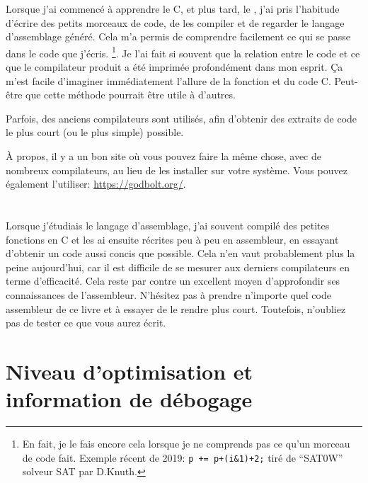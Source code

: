 ﻿

Lorsque j'ai commencé à apprendre le C, et plus tard, le \Cpp, j'ai pris l'habitude d'écrire des petits morceaux de
code, de les compiler et de regarder le langage d'assemblage généré.
Cela m'a permis de comprendre facilement ce qui se passe dans le code que j'écris.
\footnote{En fait, je le fais encore cela lorsque je ne comprends pas ce qu'un morceau de code fait.
Exemple récent de 2019: \verb|p += p+(i&1)+2;| tiré de ``SAT0W'' solveur SAT par D.Knuth.}.
Je l'ai fait si souvent que la relation entre le code \Cpp et ce que le compilateur produit a été imprimée profondément dans mon esprit.
Ça m'est facile d'imaginer immédiatement l'allure de la fonction et du code C.
Peut-être que cette méthode pourrait être utile à d'autres.


Parfois, des anciens compilateurs sont utilisés, afin d'obtenir des extraits de code le plus court (ou le plus simple) possible.

À propos, il y a un bon site où vous pouvez faire la même chose, avec de nombreux
compilateurs, au lieu de les installer sur votre système.
Vous pouvez également l'utiliser: \url{https://godbolt.org/}.

\section*{\Exercises}

Lorsque j'étudiais le langage d'assemblage, j'ai souvent compilé des petites fonctions
en C et les ai ensuite récrites peu à peu en assembleur, en essayant d'obtenir un
code aussi concis que possible.
Cela n'en vaut probablement plus la peine aujourd'hui, car il est difficile de se
mesurer aux derniers compilateurs en terme d'efficacité. Cela reste par contre un
excellent moyen d'approfondir ses connaissances de l'assembleur.
N'hésitez pas à prendre n'importe quel code assembleur de ce livre et à essayer
de le rendre plus court.
Toutefois, n'oubliez pas de tester ce que vous aurez écrit.

\section*{Niveau d'optimisation et information de débogage}

